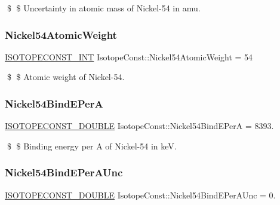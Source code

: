 \$ \$ Uncertainty in atomic mass of Nickel-\/54 in amu. \mbox{\label{group___isotope_const-_nickel-_ni54_gaccf6cd732e22414db41db65adcf8b1e7}} 
\subsubsection{\texorpdfstring{Nickel54\+Atomic\+Weight}{Nickel54AtomicWeight}}
{\footnotesize\ttfamily \mbox{\hyperlink{group___isotope_const-_macros_ga5f18360b3e99483a35c32d789e62621c}{I\+S\+O\+T\+O\+P\+E\+C\+O\+N\+S\+T\+\_\+\+I\+NT}} Isotope\+Const\+::\+Nickel54\+Atomic\+Weight = 54}

\$ \$ Atomic weight of Nickel-\/54. \mbox{\label{group___isotope_const-_nickel-_ni54_ga6b5dc4075c847e5a5560bda27e115cd6}} 
\subsubsection{\texorpdfstring{Nickel54\+Bind\+E\+PerA}{Nickel54BindEPerA}}
{\footnotesize\ttfamily \mbox{\hyperlink{group___isotope_const-_macros_ga8f45a7272ce02c0b4c65c44636ed719a}{I\+S\+O\+T\+O\+P\+E\+C\+O\+N\+S\+T\+\_\+\+D\+O\+U\+B\+LE}} Isotope\+Const\+::\+Nickel54\+Bind\+E\+PerA = 8393.}

\$ \$ Binding energy per A of Nickel-\/54 in keV. \mbox{\label{group___isotope_const-_nickel-_ni54_gacae1e6fd1a72637ba3ff5af90217c832}} 
\subsubsection{\texorpdfstring{Nickel54\+Bind\+E\+Per\+A\+Unc}{Nickel54BindEPerAUnc}}
{\footnotesize\ttfamily \mbox{\hyperlink{group___isotope_const-_macros_ga8f45a7272ce02c0b4c65c44636ed719a}{I\+S\+O\+T\+O\+P\+E\+C\+O\+N\+S\+T\+\_\+\+D\+O\+U\+B\+LE}} Isotope\+Const\+::\+Nickel54\+Bind\+E\+Per\+A\+Unc = 0.}

